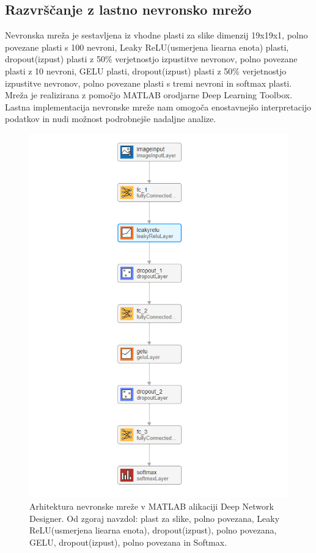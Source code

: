 \subsection{Razvrščanje z lastno nevronsko mrežo}
Nevronska mreža je sestavljena iz vhodne plasti za slike dimenzij 19x19x1, polno povezane plasti s 100 nevroni, Leaky ReLU(usmerjena liearna enota) plasti, dropout(izpust) plasti z 50\% verjetnostjo izpustitve nevronov, polno povezane plasti z 10 nevroni, GELU plasti, dropout(izpust) plasti z 50\% verjetnostjo izpustitve nevronov, polno povezane plasti s tremi nevroni in softmax plasti. Mreža je realizirana z pomočjo MATLAB orodjarne Deep Learning Toolbox. Lastna implementacija nevronske mreže nam omogoča enostavnejšo interpretacijo podatkov in nudi možnost podrobnejše nadaljne analize.
\begin{figure}[h!]
\begin{center}
\includegraphics[width=0.8\linewidth]{slike/Neural network.png}
\end{center}
\caption{Arhitektura nevronske mreže v MATLAB alikaciji Deep Network Designer. Od zgoraj navzdol: plast za slike, polno povezana, Leaky ReLU(usmerjena liearna enota), dropout(izpust), polno povezana, GELU, dropout(izpust), polno povezana in Softmax.}
\end{figure}






